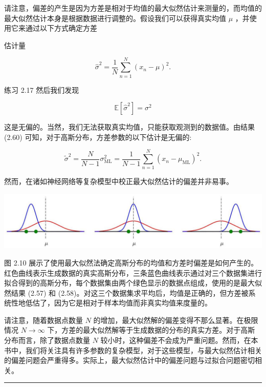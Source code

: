 \documentclass[10pt]{article}
\newcommand{\HRule}{\begin{center}\rule{0.9\linewidth}{0.2mm}\end{center}}
\begin{document}
请注意，偏差的产生是因为方差是相对于均值的最大似然估计来测量的，而均值的最大似然估计本身是根据数据进行调整的。假设我们可以获得真实均值 \(\mu\) ，并使用它来通过以下方式确定方差

估计量

\[
{\widehat{\sigma }}^{2} = \frac{1}{N}\mathop{\sum }\limits_{{n = 1}}^{N}{\left( {x}_{n} - \mu \right) }^{2}. \tag{2.61}
\]

练习 2.17 然后我们发现

\[
\mathbb{E}\left\lbrack  {\widehat{\sigma }}^{2}\right\rbrack   = {\sigma }^{2} \tag{2.62}
\]

这是无偏的。当然，我们无法获取真实均值，只能获取观测到的数据值。由结果 (2.60) 可知，对于高斯分布，方差参数的以下估计是无偏的:

\[
{\widetilde{\sigma }}^{2} = \frac{N}{N - 1}{\sigma }_{\mathrm{{ML}}}^{2} = \frac{1}{N - 1}\mathop{\sum }\limits_{{n = 1}}^{N}{\left( {x}_{n} - {\mu }_{\mathrm{{ML}}}\right) }^{2}. \tag{2.63}
\]

然而，在诸如神经网络等复杂模型中校正最大似然估计的偏差并非易事。

\begin{center}
\includegraphics[max width=1.0\textwidth]{images/0194e279-9b28-703a-88f4-c3ac21e2010d_59_244_343_1304_276_0.jpg}
\end{center}
\hspace*{3em} 

图 2.10 展示了使用最大似然法确定高斯分布的均值和方差时偏差是如何产生的。红色曲线表示生成数据的真实高斯分布，三条蓝色曲线表示通过对三个数据集进行拟合得到的高斯分布，每个数据集由两个绿色显示的数据点组成，使用的是最大似然结果 (2.57) 和 (2.58)。对这三个数据集求平均后，均值是正确的，但方差被系统性地低估了，因为它是相对于样本均值而非真实均值来度量的。

请注意，随着数据点数量 \(N\) 的增加，最大似然解的偏差变得不那么显著。在极限情况 \(N \rightarrow  \infty\) 下，方差的最大似然解等于生成数据的分布的真实方差。对于高斯分布而言，除了数据点数量 \(N\) 较小时，这种偏差不会成为严重问题。然而，在本书中，我们将关注具有许多参数的复杂模型，对于这些模型，与最大似然估计相关的偏差问题会严重得多。实际上，最大似然估计中的偏差问题与过拟合问题密切相关。

\HRule
\end{document}
